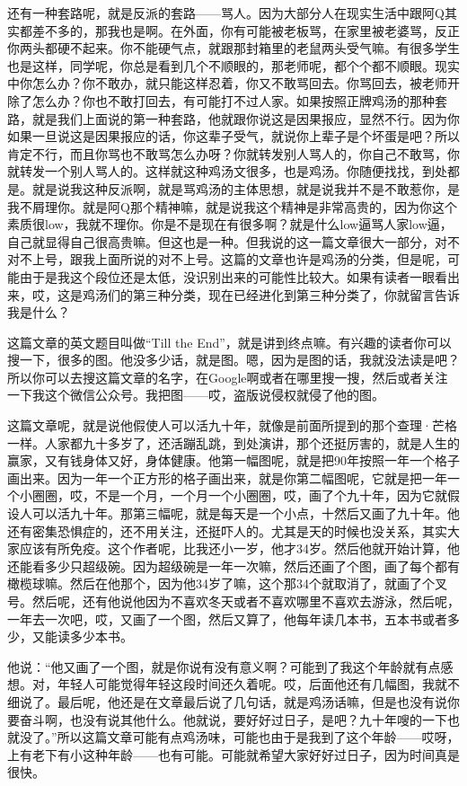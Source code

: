 \documentclass[
  letterpaper,
  DIV=11,
  numbers=noendperiod]{scrreprt}
\begin{document}
还有一种套路呢，就是反派的套路------骂人。因为大部分人在现实生活中跟阿Q其实都差不多的，那我也是啊。在外面，你有可能被老板骂，在家里被老婆骂，反正你两头都硬不起来。你不能硬气点，就跟那封箱里的老鼠两头受气嘛。有很多学生也是这样，同学呢，你总是看到几个不顺眼的，那老师呢，都个个都不顺眼。现实中你怎么办？你不敢办，就只能这样忍着，你又不敢骂回去。你骂回去，被老师开除了怎么办？你也不敢打回去，有可能打不过人家。如果按照正牌鸡汤的那种套路，就是我们上面说的第一种套路，他就跟你说这是因果报应，显然不行。因为你如果一旦说这是因果报应的话，你这辈子受气，就说你上辈子是个坏蛋是吧？所以肯定不行，而且你骂也不敢骂怎么办呀？你就转发别人骂人的，你自己不敢骂，你就转发一个别人骂人的。这样就这种鸡汤文很多，也是鸡汤。你随便找找，到处都是。就是说我这种反派啊，就是骂鸡汤的主体思想，就是说我并不是不敢惹你，是我不屑理你。就是阿Q那个精神嘛，就是说我这个精神是非常高贵的，因为你这个素质很low，我就不理你。你是不是现在有很多啊？就是什么low逼骂人家low逼，自己就显得自己很高贵嘛。但这也是一种。但我说的这一篇文章很大一部分，对不对不上号，跟我上面所说的对不上号。这篇的文章也许是鸡汤的分类，但是呢，可能由于是我这个段位还是太低，没识别出来的可能性比较大。如果有读者一眼看出来，哎，这是鸡汤们的第三种分类，现在已经进化到第三种分类了，你就留言告诉我是什么？

这篇文章的英文题目叫做``Till the
End''，就是讲到终点嘛。有兴趣的读者你可以搜一下，很多的图。他没多少话，就是图。嗯，因为是图的话，我就没法读是吧？所以你可以去搜这篇文章的名字，在Google啊或者在哪里搜一搜，然后或者关注一下我这个微信公众号。我把图------哎，盗版说侵权就侵了他的图。

这篇文章呢，就是说他假使人可以活九十年，就像是前面所提到的那个查理·芒格一样。人家都九十多岁了，还活蹦乱跳，到处演讲，那个还挺厉害的，就是人生的赢家，又有钱身体又好，身体健康。他第一幅图呢，就是把90年按照一年一个格子画出来。因为一年一个正方形的格子画出来，就是你第二幅图呢，它就是把一年一个小圈圈，哎，不是一个月，一个月一个小圈圈，哎，画了个九十年，因为它就假设人可以活九十年。那第三幅呢，就是每天是一个小点，十然后又画了九十年。他还有密集恐惧症的，还不用关注，还挺吓人的。尤其是天的时候也没关系，其实大家应该有所免疫。这个作者呢，比我还小一岁，他才34岁。然后他就开始计算，他还能看多少只超级碗。因为超级碗是一年一次嘛，然后还画了个图，画了每个都有橄榄球嘛。然后在他那个，因为他34岁了嘛，这个那34个就取消了，就画了个叉号。然后呢，还有他说他因为不喜欢冬天或者不喜欢哪里不喜欢去游泳，然后呢，一年去一次吧，哎，又画了一个图，然后又算了，他每年读几本书，五本书或者多少，又能读多少本书。

他说：``他又画了一个图，就是你说有没有意义啊？可能到了我这个年龄就有点感想。对，年轻人可能觉得年轻这段时间还久着呢。哎，后面他还有几幅图，我就不细说了。最后呢，他还是在文章最后说了几句话，就是鸡汤话嘛，但是也没有说你要奋斗啊，也没有说其他什么。他就说，要好好过日子，是吧？九十年嗖的一下也就没了。''所以这篇文章可能有点鸡汤味，可能也由于是我到了这个年龄------哎呀，上有老下有小这种年龄------也有可能。可能就希望大家好好过日子，因为时间真是很快。
\end{document}
